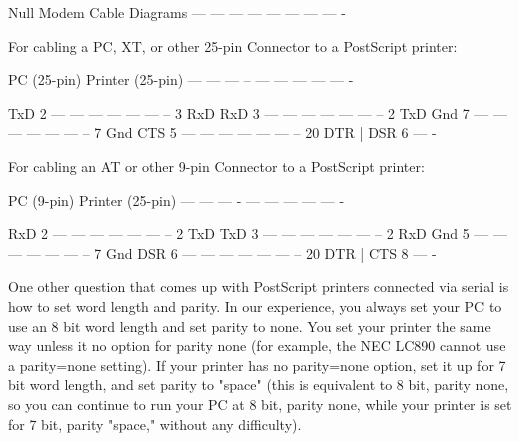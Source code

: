 









                              Null Modem Cable Diagrams
                              --- --- --- --- --- --- --- --- -

For cabling a PC, XT, or other 25-pin Connector to a PostScript printer:

                    PC (25-pin)             Printer (25-pin)
                    --- ---  --- --             --- --- --- ---  --- -

                      TxD  2 --- --- --- --- --- --- -- 3  RxD
                      RxD  3 --- --- --- --- --- --- -- 2  TxD
                      Gnd  7 --- --- --- --- --- --- -- 7  Gnd
                      CTS  5 --- --- --- --- --- --- -- 20 DTR
                                 |
                      DSR  6  --- -

For cabling an AT or other 9-pin Connector to a PostScript printer:

                    PC (9-pin)             Printer (25-pin)
                    --- ---  --- -             --- --- --- ---  --- -

                      RxD  2 --- --- --- --- --- --- -- 2  TxD
                      TxD  3 --- --- --- --- --- --- -- 2  RxD
                      Gnd  5 --- --- --- --- --- --- -- 7  Gnd
                      DSR  6 --- --- --- --- --- --- -- 20 DTR
                                 |
                      CTS  8  --- -


           One other question that comes up with PostScript printers
           connected via serial is how to set word length and parity. In our
           experience, you always set your PC to use an 8 bit word length and
           set parity to none. You set your printer the same way unless it
           no option for parity none (for example, the NEC LC890 cannot use
           a parity=none setting). If your printer has no parity=none option,
           set it up for 7 bit word length, and set parity to "space" (this
           is equivalent to 8 bit, parity none, so you can continue to run
           your PC at 8 bit, parity none, while your printer is set for 7 bit,
           parity "space," without any difficulty).


